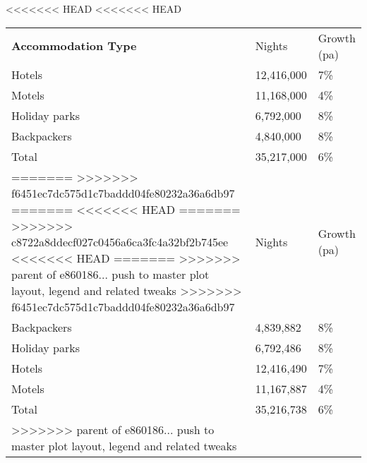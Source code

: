 <<<<<<< HEAD
<<<<<<< HEAD
\begin{tabular}[t]{p{4.5cm}>{\hfill}p{1.3cm}>{\hfill}p{1.7cm}}
 \textbf{Accommodation Type} & Nights & Growth (pa) \\ 
 Hotels & 12,416,000 & 7\% \\ 
  Motels & 11,168,000 & 4\% \\ 
  Holiday parks &  6,792,000 & 8\% \\ 
  Backpackers &  4,840,000 & 8\% \\ 
  Total & 35,217,000 & 6\% \\ 
=======
>>>>>>> f6451ec7dc575d1c7baddd04fe80232a36a6db97
=======
<<<<<<< HEAD
=======
>>>>>>> c8722a8ddecf027c0456a6ca3fc4a32bf2b745ee
<<<<<<< HEAD
=======
>>>>>>> parent of e860186... push to master plot layout, legend and related tweaks
>>>>>>> f6451ec7dc575d1c7baddd04fe80232a36a6db97
\begin{tabular}[t]{p{4.8cm}>{\hfill}p{1.3cm}>{\hfill}p{1.4cm}}
 \textbf{Accommodation Type} & Nights & Growth (pa) \\ 
 Backpackers &  4,839,882 & 8\% \\ 
  Holiday parks &  6,792,486 & 8\% \\ 
  Hotels & 12,416,490 & 7\% \\ 
  Motels & 11,167,887 & 4\% \\ 
  Total & 35,216,738 & 6\% \\ 
>>>>>>> parent of e860186... push to master plot layout, legend and related tweaks
  \end{tabular}
